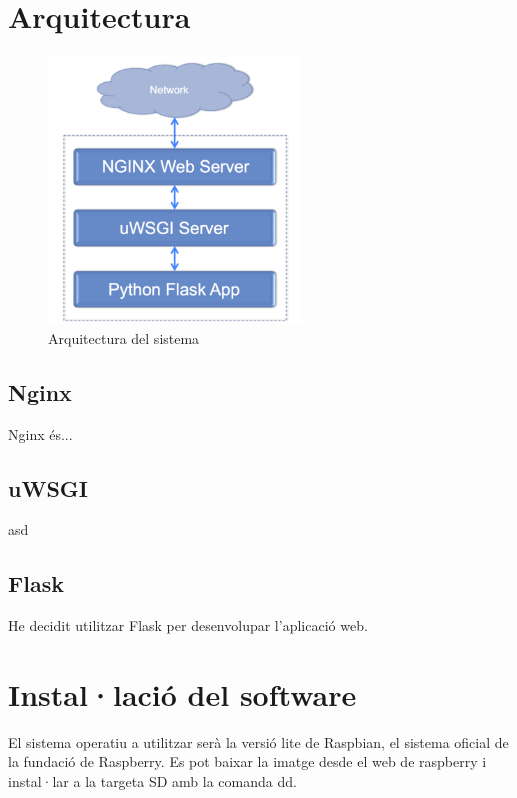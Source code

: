 \section{Arquitectura}

	\begin{figure}[H]
			\centering
			\includegraphics[width=0.6\textwidth]{images/server}
			\caption{Arquitectura del sistema}
	\end{figure}

	\subsection{Nginx}
		Nginx és...
	\subsection{uWSGI}
		asd
	\subsection{Flask}
		He decidit utilitzar Flask per desenvolupar l'aplicació web.

\section{Instal·lació del software}
	
	El sistema operatiu a utilitzar serà la versió lite de Raspbian, el sistema oficial de la fundació de Raspberry.
	Es pot baixar la imatge desde el web de raspberry i instal·lar a la targeta SD amb la comanda dd.\\


